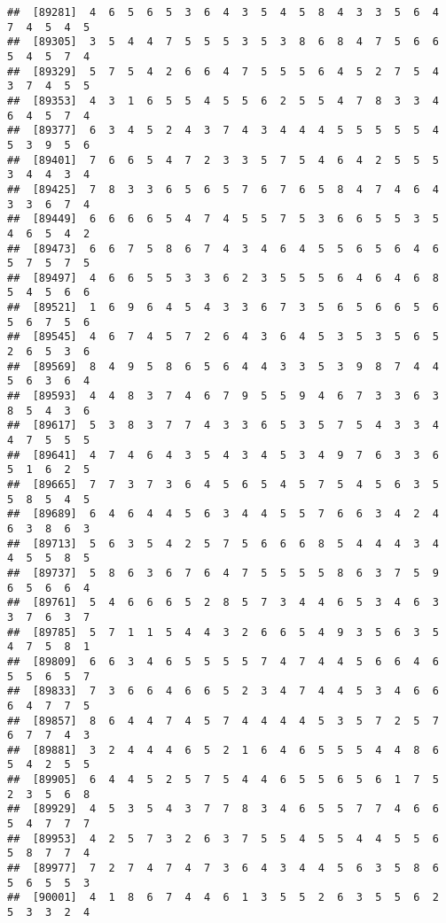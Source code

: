 \documentclass[
]{book}
\begin{document}
\begin{verbatim}
##  [89281]  4  6  5  6  5  3  6  4  3  5  4  5  8  4  3  3  5  6  4  7  4  5  4  5
##  [89305]  3  5  4  4  7  5  5  5  3  5  3  8  6  8  4  7  5  6  6  5  4  5  7  4
##  [89329]  5  7  5  4  2  6  6  4  7  5  5  5  6  4  5  2  7  5  4  3  7  4  5  5
##  [89353]  4  3  1  6  5  5  4  5  5  6  2  5  5  4  7  8  3  3  4  6  4  5  7  4
##  [89377]  6  3  4  5  2  4  3  7  4  3  4  4  4  5  5  5  5  5  4  5  3  9  5  6
##  [89401]  7  6  6  5  4  7  2  3  3  5  7  5  4  6  4  2  5  5  5  3  4  4  3  4
##  [89425]  7  8  3  3  6  5  6  5  7  6  7  6  5  8  4  7  4  6  4  3  3  6  7  4
##  [89449]  6  6  6  6  5  4  7  4  5  5  7  5  3  6  6  5  5  3  5  4  6  5  4  2
##  [89473]  6  6  7  5  8  6  7  4  3  4  6  4  5  5  6  5  6  4  6  5  7  5  7  5
##  [89497]  4  6  6  5  5  3  3  6  2  3  5  5  5  6  4  6  4  6  8  5  4  5  6  6
##  [89521]  1  6  9  6  4  5  4  3  3  6  7  3  5  6  5  6  6  5  6  5  6  7  5  6
##  [89545]  4  6  7  4  5  7  2  6  4  3  6  4  5  3  5  3  5  6  5  2  6  5  3  6
##  [89569]  8  4  9  5  8  6  5  6  4  4  3  3  5  3  9  8  7  4  4  5  6  3  6  4
##  [89593]  4  4  8  3  7  4  6  7  9  5  5  9  4  6  7  3  3  6  3  8  5  4  3  6
##  [89617]  5  3  8  3  7  7  4  3  3  6  5  3  5  7  5  4  3  3  4  4  7  5  5  5
##  [89641]  4  7  4  6  4  3  5  4  3  4  5  3  4  9  7  6  3  3  6  5  1  6  2  5
##  [89665]  7  7  3  7  3  6  4  5  6  5  4  5  7  5  4  5  6  3  5  5  8  5  4  5
##  [89689]  6  4  6  4  4  5  6  3  4  4  5  5  7  6  6  3  4  2  4  6  3  8  6  3
##  [89713]  5  6  3  5  4  2  5  7  5  6  6  6  8  5  4  4  4  3  4  4  5  5  8  5
##  [89737]  5  8  6  3  6  7  6  4  7  5  5  5  5  8  6  3  7  5  9  6  5  6  6  4
##  [89761]  5  4  6  6  6  5  2  8  5  7  3  4  4  6  5  3  4  6  3  3  7  6  3  7
##  [89785]  5  7  1  1  5  4  4  3  2  6  6  5  4  9  3  5  6  3  5  4  7  5  8  1
##  [89809]  6  6  3  4  6  5  5  5  5  7  4  7  4  4  5  6  6  4  6  5  5  6  5  7
##  [89833]  7  3  6  6  4  6  6  5  2  3  4  7  4  4  5  3  4  6  6  6  4  7  7  5
##  [89857]  8  6  4  4  7  4  5  7  4  4  4  4  5  3  5  7  2  5  7  6  7  7  4  3
##  [89881]  3  2  4  4  4  6  5  2  1  6  4  6  5  5  5  4  4  8  6  5  4  2  5  5
##  [89905]  6  4  4  5  2  5  7  5  4  4  6  5  5  6  5  6  1  7  5  2  3  5  6  8
##  [89929]  4  5  3  5  4  3  7  7  8  3  4  6  5  5  7  7  4  6  6  5  4  7  7  7
##  [89953]  4  2  5  7  3  2  6  3  7  5  5  4  5  5  4  4  5  5  6  5  8  7  7  4
##  [89977]  7  2  7  4  7  4  7  3  6  4  3  4  4  5  6  3  5  8  6  5  6  5  5  3
##  [90001]  4  1  8  6  7  4  4  6  1  3  5  5  2  6  3  5  5  6  2  5  3  3  2  4

\end{verbatim}
\end{document}
